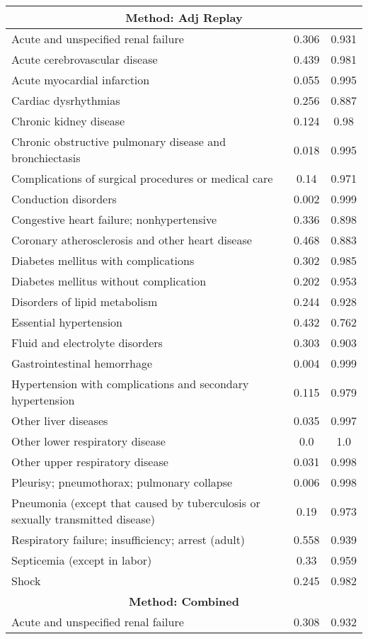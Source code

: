 \documentclass{article}
\begin{document}
\begin{longtable}{lcc}
\midrule
\multicolumn{3}{c}{\textbf{Method: Adj Replay}} \\
\midrule
Acute and unspecified renal failure & 0.306 & 0.931 \\
Acute cerebrovascular disease & 0.439 & 0.981 \\
Acute myocardial infarction & 0.055 & 0.995 \\
Cardiac dysrhythmias & 0.256 & 0.887 \\
Chronic kidney disease & 0.124 & 0.98 \\
Chronic obstructive pulmonary disease and bronchiectasis & 0.018 & 0.995 \\
Complications of surgical procedures or medical care & 0.14 & 0.971 \\
Conduction disorders & 0.002 & 0.999 \\
Congestive heart failure; nonhypertensive & 0.336 & 0.898 \\
Coronary atherosclerosis and other heart disease & 0.468 & 0.883 \\
Diabetes mellitus with complications & 0.302 & 0.985 \\
Diabetes mellitus without complication & 0.202 & 0.953 \\
Disorders of lipid metabolism & 0.244 & 0.928 \\
Essential hypertension & 0.432 & 0.762 \\
Fluid and electrolyte disorders & 0.303 & 0.903 \\
Gastrointestinal hemorrhage & 0.004 & 0.999 \\
Hypertension with complications and secondary hypertension & 0.115 & 0.979 \\
Other liver diseases & 0.035 & 0.997 \\
Other lower respiratory disease & 0.0 & 1.0 \\
Other upper respiratory disease & 0.031 & 0.998 \\
Pleurisy; pneumothorax; pulmonary collapse & 0.006 & 0.998 \\
Pneumonia (except that caused by tuberculosis or sexually transmitted disease) & 0.19 & 0.973 \\
Respiratory failure; insufficiency; arrest (adult) & 0.558 & 0.939 \\
Septicemia (except in labor) & 0.33 & 0.959 \\
Shock & 0.245 & 0.982 \\
\midrule
\multicolumn{3}{c}{\textbf{Method: Combined}} \\
\midrule
Acute and unspecified renal failure & 0.308 & 0.932 \\

\end{longtable}
\end{document}
